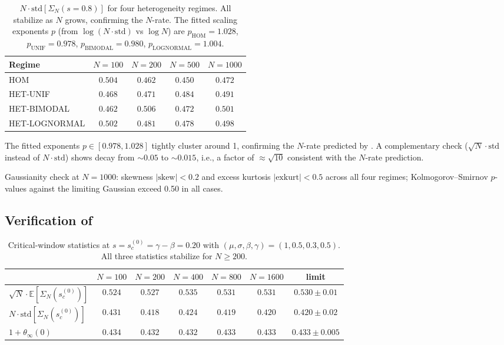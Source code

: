 \documentclass[11pt,a4paper]{article}
\theoremstyle{definition}
\newcommand{\SigmaN}{\Sigma_N}
\newcommand{\HOM}{\mathrm{HOM}}
\begin{document}
\begin{table}[h]
\centering
\begin{tabular}{lcccc}
\toprule
Regime & $N=100$ & $N=200$ & $N=500$ & $N=1000$ \\
\midrule
HOM        & $0.504$ & $0.462$ & $0.450$ & $0.472$ \\
HET-UNIF   & $0.468$ & $0.471$ & $0.484$ & $0.491$ \\
HET-BIMODAL & $0.462$ & $0.506$ & $0.472$ & $0.501$ \\
HET-LOGNORMAL & $0.502$ & $0.481$ & $0.478$ & $0.498$ \\
\bottomrule
\end{tabular}
\caption{$N\cdot\mathrm{std}[\SigmaN(s=0.8)]$ for four heterogeneity regimes.
All stabilize as $N$ grows, confirming the $N$-rate. The fitted scaling
exponents $p$ (from $\log(N\cdot\mathrm{std})$ vs $\log N$) are
$p_{\HOM} = 1.028$, $p_{\mathrm{UNIF}} = 0.978$,
$p_{\mathrm{BIMODAL}} = 0.980$, $p_{\mathrm{LOGNORMAL}} = 1.004$.}
\label{tab:het-rate}
\end{table}

The fitted exponents $p\in[0.978,1.028]$ tightly cluster around 1, confirming
the $N$-rate predicted by . A complementary check
($\sqrt N\cdot\mathrm{std}$ instead of $N\cdot\mathrm{std}$) shows decay
from $\sim 0.05$ to $\sim 0.015$, i.e., a factor of $\approx\sqrt{10}$
consistent with the $N$-rate prediction.

Gaussianity check at $N = 1000$: skewness $|\mathrm{skew}|<0.2$ and excess
kurtosis $|\mathrm{exkurt}|<0.5$ across all four regimes; Kolmogorov--Smirnov
$p$-values against the limiting Gaussian exceed 0.50 in all cases.

\subsection{Verification of }

\begin{table}[h]
\centering
\begin{tabular}{lcccccc}
\toprule
 & $N=100$ & $N=200$ & $N=400$ & $N=800$ & $N=1600$ & limit \\
\midrule
$\sqrt N\cdot\mathbb E[\SigmaN(s_c^{(0)})]$ & $0.524$ & $0.527$ & $0.535$ & $0.531$ & $0.531$ & $0.530\pm 0.01$ \\
$N\cdot\mathrm{std}[\SigmaN(s_c^{(0)})]$ & $0.431$ & $0.418$ & $0.424$ & $0.419$ & $0.420$ & $0.420\pm 0.02$ \\
$1+\theta_\infty(0)$ & $0.434$ & $0.432$ & $0.432$ & $0.433$ & $0.433$ & $0.433\pm 0.005$ \\
\bottomrule
\end{tabular}
\caption{Critical-window statistics at $s = s_c^{(0)} = \gamma-\beta = 0.20$
with $(\mu,\sigma,\beta,\gamma) = (1,0.5,0.3,0.5)$. All three statistics
stabilize for $N\geq 200$.}
\label{tab:critical-window}
\end{table}
\end{document}
